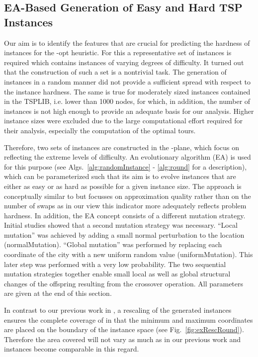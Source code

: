 \documentclass{article}
\begin{document}
\subsection{EA-Based Generation of Easy and Hard TSP Instances}
Our aim is to identify the features that are crucial for predicting
the hardness of instances for the -opt heuristic. For this a
representative set of instances is required which contains instances
of varying degrees of difficulty. It turned out that the construction
of such a set is a nontrivial task. The generation of instances in a
random manner did not provide a sufficient spread with respect to the
instance hardness. The same is true for moderately sized instances
contained in the TSPLIB, i.e. lower than 1000 nodes, for which, in
addition, the number of instances is not high enough to provide an
adequate basis for our analysis. Higher instance sizes were excluded
due to the large computational effort required for their analysis,
especially the computation of the optimal tours.

Therefore, two sets of instances are constructed in the -plane,
which focus on reflecting the extreme levels of difficulty.  An
evolutionary algorithm (EA) is used for this purpose (see
Algs.~\ref{alg:randomInstance} - \ref{alg:round} for a description),
which can be parameterized such that its aim is to evolve instances
that are either as easy or as hard as possible for a given instance
size. The approach is conceptually similar to \cite{SMHL10} but
focusses on approximation quality rather than on the number of swaps
as in our view this indicator more adequately reflects problem
hardness. In addition, the EA concept consists of a different mutation
strategy. Initial studies showed that a second mutation strategy was
necessary. ``Local mutation'' was achieved by adding a small normal
perturbation to the location (normalMutation). ``Global mutation'' was
performed by replacing each coordinate of the city with a new uniform
random value (uniformMutation). This later step was performed with a
very low probability. The two sequential mutation strategies together
enable small local as well as global structural changes of the
offspring resulting from the crossover operation. All parameters are
given at the end of this section.

In contrast to our previous work in \cite{mersmann2012}, a rescaling
of the generated instances ensures the complete coverage of 
in that the minimum and maximum coordinates are placed on the boundary
of the instance space (see Fig.~\ref{fig:exRescRound}). Therefore the
area covered will not vary as much as in our previous work and
instances become comparable in this regard.
\end{document}
